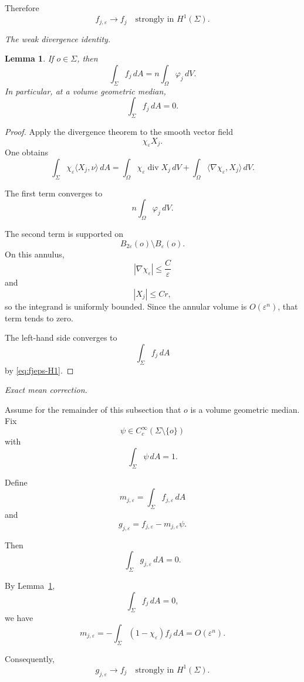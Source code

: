 \documentclass[11pt,reqno]{amsart}
\numberwithin{equation}{section}
\newtheorem{lemma}[theorem]{Lemma}
\theoremstyle{definition}
\theoremstyle{remark}
\newcommand{\diver}{\operatorname{div}}
\newcommand{\eps}{\varepsilon}
\newcommand{\ithead}[1]{%
  \par\medskip\noindent\textit{#1}\enspace
}
\begin{document}
Therefore
\begin{equation}
f_{j,\eps}
\longrightarrow
f_j
\quad\text{strongly in }H^1(\Sigma).
\label{eq:fjeps-H1}
\end{equation}

\ithead{The weak divergence identity.}

\begin{lemma}
\label{lem:boundary-zero-mean}
If \(o\in\Sigma\), then
\[
\int_\Sigma f_j\,dA
=
n\int_\Omega\varphi_j\,dV.
\]
In particular, at a volume geometric median,
\[
\int_\Sigma f_j\,dA=0.
\]
\end{lemma}

\begin{proof}
Apply the divergence theorem to the smooth vector field
\[
\chi_\eps X_j.
\]
One obtains
\[
\int_\Sigma
\chi_\eps\langle X_j,\nu\rangle\,dA
=
\int_\Omega
\chi_\eps\diver X_j\,dV
+
\int_\Omega
\langle\nabla\chi_\eps,X_j\rangle\,dV.
\]

The first term converges to
\[
n\int_\Omega\varphi_j\,dV.
\]

The second term is supported on
\[
B_{2\eps}(o)\setminus B_\eps(o).
\]
On this annulus,
\[
|\nabla\chi_\eps|
\le
\frac{C}{\eps}
\]
and
\[
|X_j|\le Cr,
\]
so the integrand is uniformly bounded. Since the annular volume is
\(O(\eps^n)\), that term tends to zero.

The left-hand side converges to
\[
\int_\Sigma f_j\,dA
\]
by \eqref{eq:fjeps-H1}.
\end{proof}

\ithead{Exact mean correction.}

Assume for the remainder of this subsection that \(o\) is a volume geometric
median.  Fix
\[
\psi\in C_c^\infty(\Sigma\setminus\{o\})
\]
with
\[
\int_\Sigma\psi\,dA=1.
\]

Define
\[
m_{j,\eps}
=
\int_\Sigma f_{j,\eps}\,dA
\]
and
\begin{equation}
g_{j,\eps}
=
f_{j,\eps}-m_{j,\eps}\psi.
\label{eq:gjeps}
\end{equation}

Then
\[
\int_\Sigma g_{j,\eps}\,dA=0.
\]

By Lemma~\ref{lem:boundary-zero-mean},
\[
\int_\Sigma f_j\,dA=0,
\]
we have
\[
m_{j,\eps}
=
-\int_\Sigma(1-\chi_\eps)f_j\,dA
=
O(\eps^n).
\]

Consequently,
\begin{equation}
g_{j,\eps}
\longrightarrow
f_j
\quad\text{strongly in }H^1(\Sigma).
\label{eq:gjeps-H1}
\end{equation}
\end{document}
